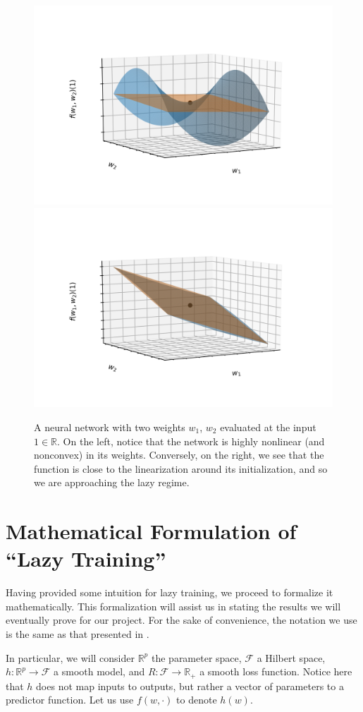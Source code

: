 \documentclass{article}
\begin{document}
\begin{figure}[H]
    \centering
    \includegraphics[width=.5\textwidth]{imgs/visualize_linearized_0.1.png}\hfill
    \includegraphics[width=.5\textwidth]{imgs/visualize_linearized_10.png}
    \caption{A neural network with two weights $w_1$, $w_2$ evaluated at the input $1 \in \mathbb{R}$. On the left, notice that the network is highly nonlinear (and nonconvex) in its weights. Conversely, on the right, we see that the function is close to the linearization around its initialization, and so we are approaching the lazy regime.}
\end{figure}

\section{Mathematical Formulation of \enquote{Lazy Training}}

Having provided some intuition for lazy training, we proceed to formalize it mathematically. This formalization will assist us in stating the results we will eventually prove for our project. For the sake of convenience, the notation we use is the same as that presented in \cite{chizat2018lazy}.

In particular, we will consider $\mathbb{R}^p$ the parameter space, $\mathcal{F}$ a Hilbert space, $h: \mathbb{R}^p \rightarrow \mathcal{F}$ a smooth model, and $R: \mathcal{F} \rightarrow \mathbb{R}_+$ a smooth loss function. Notice here that $h$ does not map inputs to outputs, but rather a vector of parameters to a predictor function. Let us use $f(w, \cdot)$ to denote $h(w)$. 
\end{document}
